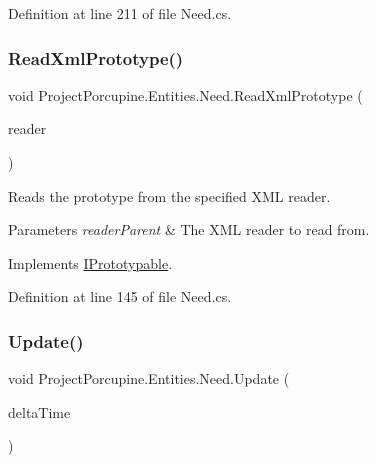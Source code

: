 Definition at line 211 of file Need.\+cs.

\mbox{\label{class_project_porcupine_1_1_entities_1_1_need_af676e3d4ffb2be13a03ebe996dbffa18}} 
\subsubsection{\texorpdfstring{Read\+Xml\+Prototype()}{ReadXmlPrototype()}}
{\footnotesize\ttfamily void Project\+Porcupine.\+Entities.\+Need.\+Read\+Xml\+Prototype (\begin{DoxyParamCaption}\item[{Xml\+Reader}]{reader }\end{DoxyParamCaption})}



Reads the prototype from the specified X\+ML reader. 


\begin{DoxyParams}{Parameters}
{\em reader\+Parent} & The X\+ML reader to read from.\\
\hline
\end{DoxyParams}


Implements \hyperlink{interface_i_prototypable_a024d752c4be655a7166db5718f1fad6a}{I\+Prototypable}.



Definition at line 145 of file Need.\+cs.

\mbox{\label{class_project_porcupine_1_1_entities_1_1_need_a00e0fc61e6ad375cc6f7a0d94200f481}} 
\subsubsection{\texorpdfstring{Update()}{Update()}}
{\footnotesize\ttfamily void Project\+Porcupine.\+Entities.\+Need.\+Update (\begin{DoxyParamCaption}\item[{float}]{delta\+Time }\end{DoxyParamCaption})}



